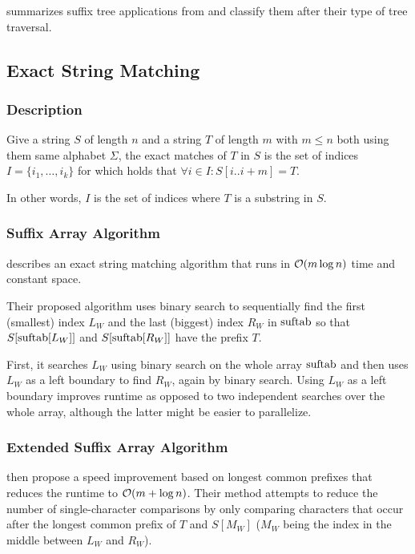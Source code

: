 \documentclass[a4paper,10pt]{article}
\begin{document}
\citealt[pg. 2]{abouelhoda2004replacing} summarizes suffix tree applications
from \citealt[chap. 2]{gusfield1997algorithms} and classify them after their
type of tree traversal.

\subsection*{Exact String Matching}

\subsubsection*{Description}

Give a string $S$ of length $n$ and a string $T$ of length $m$ with $m
\le n$ both using them same alphabet $\Sigma$, the exact matches of $T$
in $S$ is the set of indices $I=\{i_1, \ldots, i_k\}$ for which holds
that $\forall i \in I: S[i..i+m]=T$.

In other words, $I$ is the set of indices where $T$ is a substring in $S$.

\subsubsection*{Suffix Array Algorithm}

\citealt{manber1993suffix} describes an exact string matching algorithm
that runs in ${\cal{O}}(m \log n)$ time and constant space.

Their proposed algorithm uses binary search to sequentially find
the first (smallest) index $L_{W}$ and the last (biggest) index
$R_{W}$ in $\hbox{suftab}$ so that $S[\hbox{suftab}[L_{W}]]$ and
$S[\hbox{suftab}[R_{W}]]$ have the prefix $T$.

First, it searches $L_{W}$ using binary search on the whole array
$\hbox{suftab}$ and then uses $L_{W}$ as a left boundary to find $R_{W}$,
again by binary search.  Using $L_{W}$ as a left boundary improves
runtime as opposed to two independent searches over the whole array,
although the latter might be easier to parallelize.

\subsubsection*{Extended Suffix Array Algorithm}

\citealt{manber1993suffix} then propose a speed improvement based on
longest common prefixes that reduces the runtime to ${\cal{O}}(m + \log
n)$. Their method attempts to reduce the number of single-character
comparisons by only comparing characters that occur after the longest
common prefix of $T$ and $S[M_{W}]$ ($M_{W}$ being the index in the
middle between $L_{W}$ and $R_{W}$).
\end{document}
